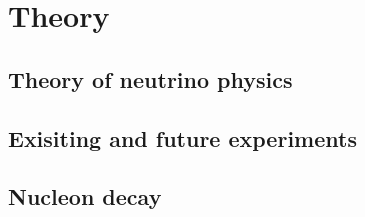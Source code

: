 
\chapter{Theory}  %

\ifpdf
    \graphicspath{{Theory/Figs/Raster/}{Theory/Figs/PDF/}{Theory/Figs/}}
\else
    \graphicspath{{Theory/Figs/Vector/}{Theory/Figs/}}
\fi

\section{Theory of neutrino physics} %

\section{Exisiting and future experiments} %

\section{Nucleon decay}  %
